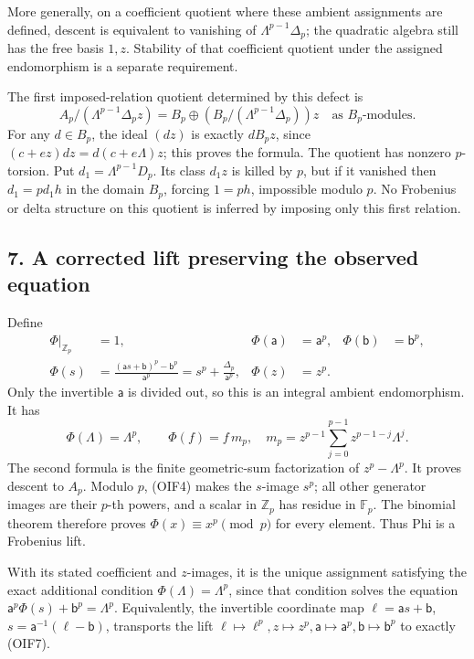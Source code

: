 \documentclass[
]{article}
\begin{document}
More generally, on a coefficient quotient where these ambient
assignments are defined, descent is equivalent to vanishing of
\(\Lambda^{p-1}\Delta_p\); the quadratic algebra still has the free
basis \(1,z\). Stability of that coefficient quotient under the assigned
endomorphism is a separate requirement.

The first imposed-relation quotient determined by this defect is \[
A_p/(\Lambda^{p-1}\Delta_pz)
=B_p\oplus
(B_p/(\Lambda^{p-1}\Delta_p))z
\quad\text{as }B_p\text{-modules}.
\tag{OIF6}
\] For any \(d\in B_p\), the ideal \((dz)\) is exactly \(dB_pz\), since
\((c+ez)dz=d(c+e\Lambda)z\); this proves the formula. The quotient has
nonzero \(p\)-torsion. Put \(d_1=\Lambda^{p-1}D_p\). Its class \(d_1z\)
is killed by \(p\), but if it vanished then \(d_1=pd_1h\) in the domain
\(B_p\), forcing \(1=ph\), impossible modulo \(p\). No Frobenius or
delta structure on this quotient is inferred by imposing only this first
relation.

\subsection{7. A corrected lift preserving the observed
equation}\label{a-corrected-lift-preserving-the-observed-equation}

Define \[
\begin{aligned}
\Phi|_{\mathbb Z_p}&=1,&
\Phi(\mathsf a)&=\mathsf a^p,&
\Phi(\mathsf b)&=\mathsf b^p,\\
\Phi(s)&=\frac{(\mathsf a s+\mathsf b)^p-\mathsf b^p}{\mathsf a^p}
=s^p+\frac{\Delta_p}{\mathsf a^p},&
\Phi(z)&=z^p.
\end{aligned}
\tag{OIF7}
\] Only the invertible \(\mathsf a\) is divided out, so this is an
integral ambient endomorphism. It has \[
\Phi(\Lambda)=\Lambda^p,\qquad
\Phi(f)=f\,m_p,\quad
m_p=z^{p-1}\sum_{j=0}^{p-1}z^{p-1-j}\Lambda^j.
\tag{OIF8}
\] The second formula is the finite geometric-sum factorization of
\(z^p-\Lambda^p\). It proves descent to \(A_p\). Modulo \(p\), (OIF4)
makes the \(s\)-image \(s^p\); all other generator images are their
\(p\)-th powers, and a scalar in \(\mathbb Z_p\) has residue in
\(\mathbb F_p\). The binomial theorem therefore proves
\(\Phi(x)\equiv x^p\pmod p\) for every element. Thus Phi is a Frobenius
lift.

With its stated coefficient and \(z\)-images, it is the unique
assignment satisfying the exact additional condition
\(\Phi(\Lambda)=\Lambda^p\), since that condition solves the equation
\(\mathsf a^p\Phi(s)+\mathsf b^p=\Lambda^p\). Equivalently, the
invertible coordinate map \(\ell=\mathsf a s+\mathsf b\),
\(s=\mathsf a^{-1}(\ell-\mathsf b)\), transports the lift
\(\ell\mapsto\ell^p,z\mapsto z^p,\mathsf a\mapsto\mathsf a^p,\mathsf b\mapsto\mathsf b^p\)
to exactly (OIF7).
\end{document}
